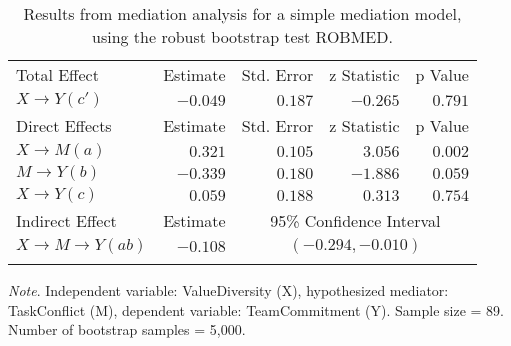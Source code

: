 \documentclass{article}\usepackage[]{graphicx}\usepackage[]{xcolor}
\begin{document}




\begin{table}[h!]
\caption{Results from mediation analysis for a simple mediation model, using the robust bootstrap test ROBMED.}
\begin{center}
\begin{tabular}{lrrrr}
\hline\noalign{\smallskip}
Total Effect & Estimate & Std. Error & z Statistic & p Value \\ 
\noalign{\smallskip}\hline\noalign{\smallskip}
$X \rightarrow Y (c')$ & $-0.049$ & $0.187$ & $-0.265$ & $0.791$ \\ 
\noalign{\smallskip}\hline\noalign{\smallskip}
Direct Effects & Estimate & Std. Error & z Statistic & p Value \\ 
\noalign{\smallskip}\hline\noalign{\smallskip}
$X \rightarrow M (a)$ & $0.321$ & $0.105$ & $3.056$ & $0.002$ \\ 
$M \rightarrow Y (b)$ & $-0.339$ & $0.180$ & $-1.886$ & $0.059$ \\ 
$X \rightarrow Y (c)$ & $0.059$ & $0.188$ & $0.313$ & $0.754$ \\ 
\noalign{\smallskip}\hline\noalign{\smallskip}
Indirect Effect & Estimate & \multicolumn{3}{c}{95\% Confidence Interval} \\ 
\noalign{\smallskip}\hline\noalign{\smallskip}
$X \rightarrow M \rightarrow Y (ab)$ & $-0.108$ & \multicolumn{3}{c}{$(-0.294, -0.010)$} \\ 
\noalign{\smallskip}\hline
\end{tabular}
\end{center}
\emph{Note}. Independent variable: ValueDiversity (X), hypothesized mediator: TaskConflict (M), dependent variable: TeamCommitment (Y). Sample size = 89. Number of bootstrap samples = 5,000.
\end{table}



% 
\end{document}
